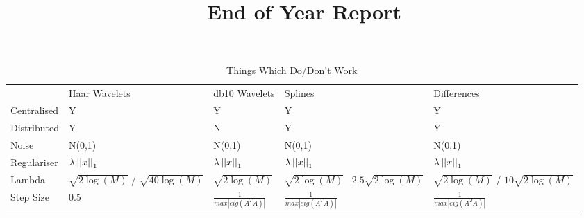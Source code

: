\documentclass{article}
\title{End of Year Report}
\begin{document}
\begin{table}[]
\centering
\caption{Things Which Do/Don't Work}
\label{my-label}
\begin{tabular}{lllll}
            & Haar Wavelets & db10 Wavelets & Splines & Differences \\
Centralised &          Y     &     Y          &     Y    &            Y \\
Distributed &     Y          &       N        &     Y    &            Y \\
Noise      &     N(0,1)          &     N(0,1)          &        N(0,1) &            N(0,1) \\
Regulariser & \(\lambda\left|\left|x\right|\right|_1\) & \(\lambda\left|\left|x\right|\right|_1\)  & \(\lambda\left|\left|x\right|\right|_1\) & \(\lambda\left|\left|x\right|\right|_1\) \\
Lambda & \(\sqrt{2\log(M)}\)  / \(\sqrt{40\log(M)}\) & \(\sqrt{2\log(M)}\) & \(\sqrt{2\log(M)}\) \ \(2.5\sqrt{2\log(M)}\)& \(\sqrt{2\log(M)}\) / \(10\sqrt{2\log(M)}\) \\
Step Size & 0.5 & \( \frac{1}{max|eig(A^TA)|} \) & \( \frac{1}{max|eig(A^TA)|} \) & \( \frac{1}{max|eig(A^TA)|} \)
\end{tabular}
\end{table}

\cite{mota}

\end{document}
